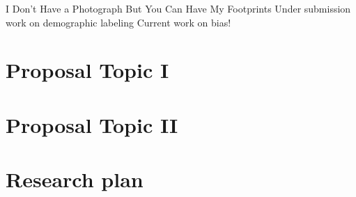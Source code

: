 \documentclass[12pt]{article}
\begin{document}
I Don’t Have a Photograph But You Can Have My Footprints
Under submission work on demographic labeling
Current work on bias!



\section{Proposal Topic I}
\label{sec:proposal-i}


\section{Proposal Topic II}
\label{sec:proposal-ii}


\section{Research plan}
\label{sec:plan}






\pagebreak

\begin{footnotesize}

% 

\end{footnotesize}
\end{document}
